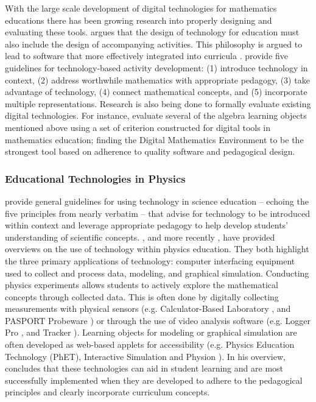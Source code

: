 \documentclass[11pt]{isuthesis}\usepackage[]{graphicx}\usepackage[]{color}
\begin{document}
With the large scale development of digital technologies for mathematics educations there has been growing research into properly designing and evaluating these tools. \citet{drijvers2012digital} argues that the design of technology for education must also include the design of accompanying activities. This philosophy is argued to lead to software that more effectively integrated into curricula \citep{freiman2014technology}. \citet{stohl2000promoting} provide five guidelines for technology-based activity development: (1) introduce technology in context, (2) address worthwhile mathematics with appropriate pedagogy, (3) take advantage of technology, (4) connect mathematical concepts, and (5) incorporate multiple representations. Research is also being done to formally evaluate existing digital technologies. For instance, \citet{bokhove2010digital} evaluate several of the algebra learning objects mentioned above using a set of criterion constructed for digital tools in mathematics education; finding the Digital Mathematics Environment \citep{DME} to be the strongest tool based on adherence to quality software and pedagogical design. 

\subsubsection{Educational Technologies in Physics}
\label{EdTechPhysics}

\citet{flick2000preparing} provide general guidelines for using technology in science education -- echoing the five principles from \citet{stohl2000promoting} nearly verbatim -- that advise for technology to be introduced within context and leverage appropriate pedagogy to help develop students' understanding of scientific concepts. \citet{rios2000guide}, and more recently \citet{bryan2006technology}, have provided overviews on the use of technology within physics education. They both highlight the three primary applications of technology: computer interfacing equipment used to collect and process data, modeling, and graphical simulation. Conducting physics experiments allows students to actively explore the mathematical concepts through collected data. This is often done by digitally collecting measurements with physical sensors (e.g. Calculator-Based Laboratory \citep{cbl}, and PASPORT Probeware \citep{pasport}) or through the use of video analysis software (e.g. Logger Pro \citep{loggerpro}, and Tracker \citep{tracker}). Learning objects for modeling or graphical simulation are often developed as web-based applets for accessibility (e.g. Physics Education Technology (PhET), Interactive Simulation \citep{PhET} and Physion \citep{physion}). In his overview, \citet{bryan2006technology} concludes that these technologies can aid in student learning and are most successfully implemented when they are developed to adhere to the pedagogical principles and clearly incorporate curriculum concepts. 
\end{document}

